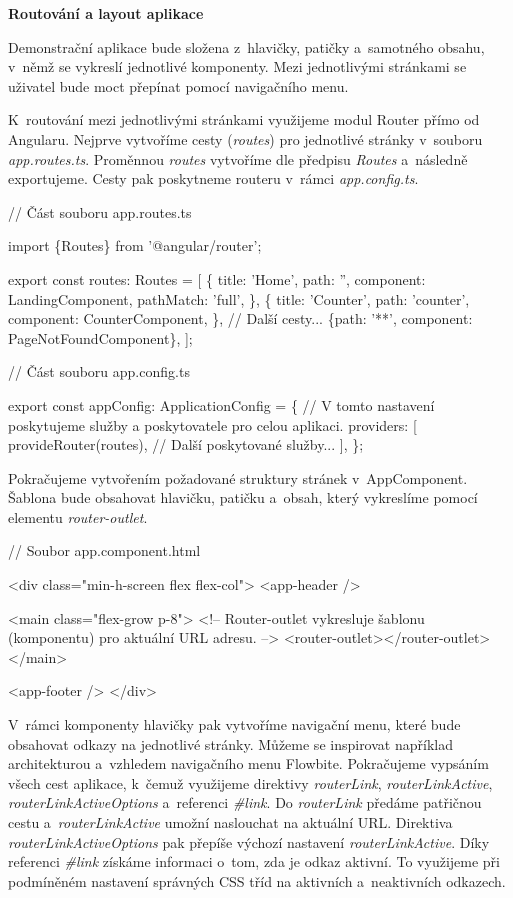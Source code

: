 \begin{flushleft}
  \textbf{Routování a layout aplikace}
\end{flushleft}

Demonstrační aplikace bude složena z~hlavičky, patičky a~samotného obsahu, v~němž se vykreslí jednotlivé komponenty. 
Mezi jednotlivými stránkami se uživatel bude moct přepínat pomocí navigačního menu.

K~routování mezi jednotlivými stránkami využijeme modul Router přímo od Angularu. Nejprve vytvoříme cesty (\emph{routes}) pro jednotlivé stránky v~souboru \emph{app.routes.ts}. 
Proměnnou \emph{routes} vytvoříme dle předpisu \emph{Routes} a~následně exportujeme. Cesty pak poskytneme routeru v~rámci \emph{app.config.ts}.

\begin{prog}
// Část souboru app.routes.ts

import \{Routes\} from '@angular/router';

export const routes: Routes = [
  \{
    title: 'Home',
    path: '',
    component: LandingComponent,
    pathMatch: 'full',
  \},
  \{
    title: 'Counter',
    path: 'counter',
    component: CounterComponent,
  \},
  // Další cesty...
  \{path: '**', component: PageNotFoundComponent\},
];

// Část souboru app.config.ts

export const appConfig: ApplicationConfig = \{
  // V tomto nastavení poskytujeme služby a poskytovatele pro celou aplikaci.
  providers: [
    provideRouter(routes),
    // Další poskytované služby...
  ],
\};
\end{prog}

Pokračujeme vytvořením požadované struktury stránek v~AppComponent. Šablona bude obsahovat hlavičku, patičku a~obsah, který vykreslíme pomocí elementu \emph{router-outlet}. 

\begin{prog}
// Soubor app.component.html

<div class="min-h-screen flex flex-col">
  <app-header />

  <main class="flex-grow p-8">
    <!-- Router-outlet vykresluje šablonu (komponentu) pro aktuální URL adresu. -->
    <router-outlet></router-outlet>
  </main>

  <app-footer />
</div>
\end{prog}

V~rámci komponenty hlavičky pak vytvoříme navigační menu, které bude obsahovat odkazy na jednotlivé stránky. 
Můžeme se inspirovat například architekturou a~vzhledem navigačního menu Flowbite. 
Pokračujeme vypsáním všech cest aplikace, k~čemuž využijeme direktivy \emph{routerLink}, \emph{routerLinkActive}, \emph{routerLinkActiveOptions} a~referenci \emph{\#link}. 
Do \emph{routerLink} předáme patřičnou cestu a~\emph{routerLinkActive} umožní naslouchat na aktuální URL. Direktiva \emph{routerLinkActiveOptions} pak přepíše výchozí nastavení \emph{routerLinkActive}.
Díky referenci \emph{\#link} získáme informaci o~tom, zda je odkaz aktivní. To využijeme při podmíněném nastavení správných CSS tříd na aktivních a~neaktivních odkazech.

